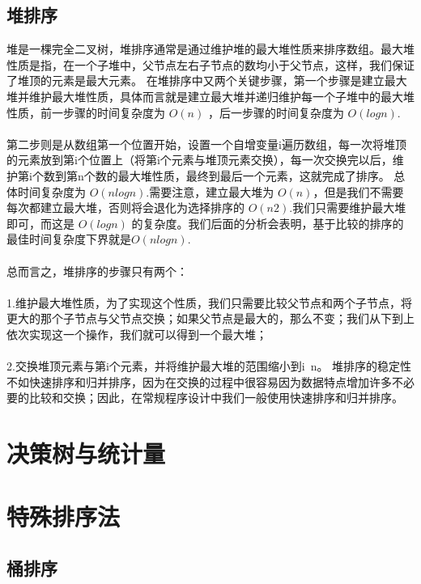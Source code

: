 \documentclass[12pt,a4paper,UTF16]{ctexbook}
\theoremstyle{plain}
\begin{document}
\subsection{堆排序}
堆是一棵完全二叉树，堆排序通常是通过维护堆的最大堆性质来排序数组。最大堆性质是指，在一个子堆中，父节点左右子节点的数均小于父节点，这样，我们保证了堆顶的元素是最大元素。
在堆排序中又两个关键步骤，第一个步骤是建立最大堆并维护最大堆性质，具体而言就是建立最大堆并递归维护每一个子堆中的最大堆性质，前一步骤的时间复杂度为 $O(n)$
 ，后一步骤的时间复杂度为 $O(log⁡n)$.
 \paragraph{}第二步则是从数组第一个位置开始，设置一个自增变量i遍历数组，每一次将堆顶的元素放到第i个位置上（将第i个元素与堆顶元素交换），每一次交换完以后，维护第i个数到第n个数的最大堆性质，最终到最后一个元素，这就完成了排序。
总体时间复杂度为 $O(nlog⁡n)$.需要注意，建立最大堆为 $O(n)$，但是我们不需要每次都建立最大堆，否则将会退化为选择排序的 $O(n2)$.我们只需要维护最大堆即可，而这是 $O(log⁡n)$
 的复杂度。我们后面的分析会表明，基于比较的排序的最佳时间复杂度下界就是$O(nlog⁡n)$.
\paragraph{}总而言之，堆排序的步骤只有两个：
\paragraph{}1.维护最大堆性质，为了实现这个性质，我们只需要比较父节点和两个子节点，将更大的那个子节点与父节点交换；如果父节点是最大的，那么不变；我们从下到上依次实现这一个操作，我们就可以得到一个最大堆；
\paragraph{}2.交换堆顶元素与第i个元素，并将维护最大堆的范围缩小到i~n。
堆排序的稳定性不如快速排序和归并排序，因为在交换的过程中很容易因为数据特点增加许多不必要的比较和交换；因此，在常规程序设计中我们一般使用快速排序和归并排序。
\section{决策树与统计量}
\section{特殊排序法}
\subsection{桶排序}
\end{document}
